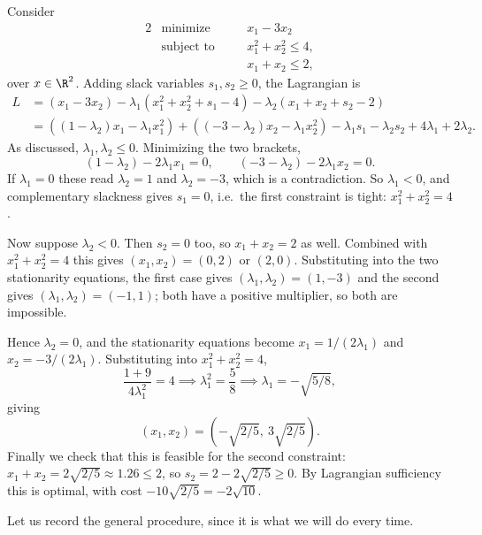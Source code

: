 \documentclass[a4paper]{scrartcl}
\begin{document}
\begin{example}
    Consider
    \begin{alignat*}{2}
        & \text{minimize} \quad && x_1 - 3x_2 \\
        & \text{subject to} \quad && x_1^2 + x_2^2 \leq 4, \\
        & && x_1 + x_2 \leq 2,
    \end{alignat*}
    over $x \in \R^2$. Adding slack variables $s_1, s_2 \geq 0$, the Lagrangian is
    \begin{align*}
        L &= (x_1 - 3x_2) - \lambda_1(x_1^2 + x_2^2 + s_1 - 4) - \lambda_2(x_1 + x_2 + s_2 - 2)\\
        &= \left((1 - \lambda_2)x_1 - \lambda_1x_1^2\right) + \left((-3 - \lambda_2)x_2 - \lambda_1 x_2^2\right) - \lambda_1 s_1 - \lambda_2 s_2 + 4\lambda_1 + 2\lambda_2.
    \end{align*}
    As discussed, $\lambda_1, \lambda_2 \leq 0$. Minimizing the two brackets,
    $$
    (1 - \lambda_2) - 2\lambda_1 x_1 = 0, \qquad (-3 - \lambda_2) - 2\lambda_1 x_2 = 0.
    $$
    If $\lambda_1 = 0$ these read $\lambda_2 = 1$ and $\lambda_2 = -3$, which is a contradiction. So $\lambda_1 < 0$, and complementary slackness gives $s_1 = 0$, i.e.\ the first constraint is tight: $x_1^2 + x_2^2 = 4$.

    Now suppose $\lambda_2 < 0$. Then $s_2 = 0$ too, so $x_1 + x_2 = 2$ as well. Combined with $x_1^2 + x_2^2 = 4$ this gives $(x_1, x_2) = (0,2)$ or $(2,0)$. Substituting into the two stationarity equations, the first case gives $(\lambda_1, \lambda_2) = (1, -3)$ and the second gives $(\lambda_1, \lambda_2) = (-1, 1)$; both have a positive multiplier, so both are impossible.

    Hence $\lambda_2 = 0$, and the stationarity equations become $x_1 = 1/(2\lambda_1)$ and $x_2 = -3/(2\lambda_1)$. Substituting into $x_1^2 + x_2^2 = 4$,
    $$
    \frac{1 + 9}{4\lambda_1^2} = 4 \implies \lambda_1^2 = \frac{5}{8} \implies \lambda_1 = -\sqrt{5/8},
    $$
    giving
    $$
    (x_1, x_2) = \left(-\sqrt{2/5},\ 3\sqrt{2/5}\right).
    $$
    Finally we check that this is feasible for the second constraint: $x_1 + x_2 = 2\sqrt{2/5} \approx 1.26 \leq 2$, so $s_2 = 2 - 2\sqrt{2/5} \geq 0$. By Lagrangian sufficiency this is optimal, with cost $-10\sqrt{2/5} = -2\sqrt{10}$.
\end{example}

Let us record the general procedure, since it is what we will do every time.
\end{document}
